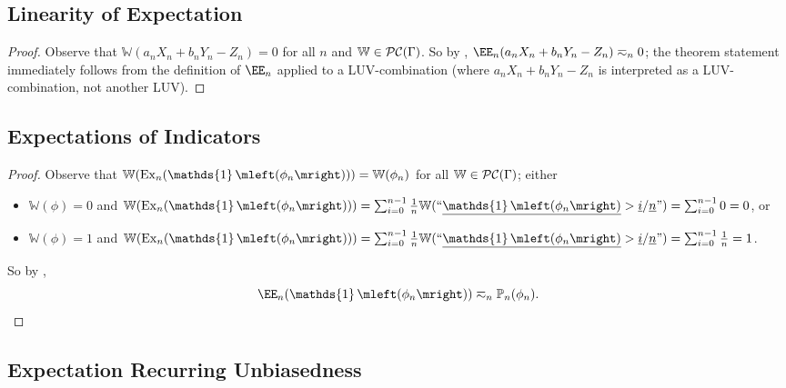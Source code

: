 \documentclass[authordate,onecolumn,noenvironments]{miri-tech-article}
\numberwithin{equation}{subsection}
\newcommand{\quot}[1]{``#1"}
\newcommand{\enc}[1]{{\underline{#1}}}
\newcommand{\alta}{\mathrm{Ex}} %
\newcommand{\BelState}{\mathbb{P}}
\newcommand{\pt}{\BelState}
\newcommand{\pcworlds}{\mathcal{P\-C}}
\newcommand{\cworlds}{\mathcal{P\-C}} %
\newcommand{\World}{\mathbb{W}}
\newcommand{\Theory}{\Gamma}
\DeclareMathOperator{\OneOperator}{\mathds{1}}
\newcommand{\sentind}[1]{\OneOperator\mleft(#1\mright)}
\begin{document}
\subsection{Linearity of Expectation}\label{app:loe}

\restateloe*

\begin{proof}
  Observe that $\World(a_n X_n + b_n Y_n - Z_n) = 0$ for all $n$ and $\World \in \pcworlds(\Theory)$.  So by , $\EE_n(a_n X_n + b_n Y_n - Z_n) \eqsim_n 0$; the theorem statement immediately follows from the definition of $\EE_n$ applied to a LUV-combination (where $a_n X_n + b_n Y_n - Z_n$ is interpreted as a LUV-combination, not another LUV).
\end{proof}


\subsection{Expectations of Indicators}\label{app:ei}
\restateei*
\begin{proof}
  Observe that $\World(\alta_n(\sentind{\phi_n})) = \World(\phi_n)$ for all $\World \in \cworlds(\Theory)$; either 
  \begin{itemize}
    \item $\World(\phi) = 0$ and $\World(\alta_n(\sentind{\phi_n})) = \sum_{i=0}^{n-1} \frac{1}{n} \World(\quot{\enc{\sentind{\phi_n}} > \enc{i}/\enc{n}}) = \sum_{i=0}^{n-1} 0 = 0$, or
    \item $\World(\phi) = 1$ and $\World(\alta_n(\sentind{\phi_n})) = \sum_{i=0}^{n-1} \frac{1}{n} \World(\quot{\enc{\sentind{\phi_n}} > \enc{i}/\enc{n}}) = \sum_{i=0}^{n-1} \frac{1}{n} = 1$.
  \end{itemize}
  So by ,
  \[ \EE_n(\sentind{\phi_n}) \eqsim_n \pt_n(\phi_n). \]
\end{proof}



\subsection{Expectation Recurring Unbiasedness}\label{app:recurringunbiasednessexp}

\recurringunbiasednessexp*
\end{document}
